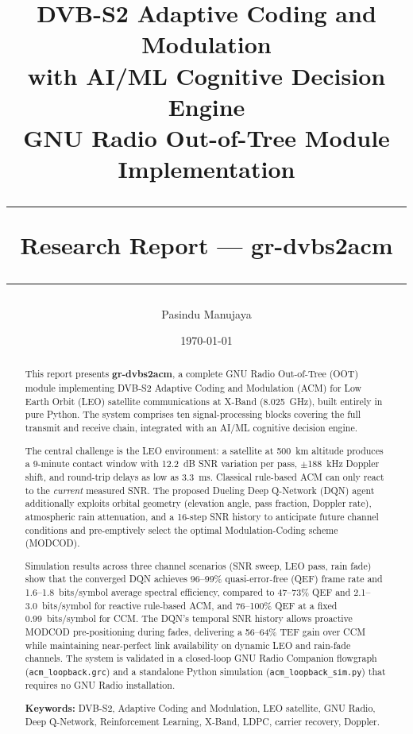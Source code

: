 \documentclass[12pt,a4paper]{report}
\title{
    \vspace{2cm}
    {\LARGE \textbf{DVB-S2 Adaptive Coding and Modulation}}\\[0.5em]
    {\large with AI/ML Cognitive Decision Engine}\\[0.5em]
    {\large GNU Radio Out-of-Tree Module Implementation}\\[2cm]
    \hrule
    \vspace{0.5em}
    {\normalsize Research Report --- gr-dvbs2acm}\\
    \vspace{0.5em}
    \hrule
}
\author{Pasindu Manujaya}
\date{\today}
\begin{document}
\maketitle
\thispagestyle{empty}

\begin{abstract}
\noindent
This report presents \textbf{gr-dvbs2acm}, a complete GNU Radio Out-of-Tree (OOT)
module implementing DVB-S2 Adaptive Coding and Modulation (ACM) for Low Earth Orbit
(LEO) satellite communications at X-Band (8.025~GHz), built entirely in pure Python.
The system comprises ten signal-processing blocks covering the full transmit and
receive chain, integrated with an AI/ML cognitive decision engine.

The central challenge is the LEO environment: a satellite at 500~km altitude produces
a 9-minute contact window with 12.2~dB SNR variation per pass, $\pm$188~kHz Doppler
shift, and round-trip delays as low as 3.3~ms.  Classical rule-based ACM can only
react to the \emph{current} measured SNR.  The proposed Dueling Deep Q-Network (DQN)
agent additionally exploits orbital geometry (elevation angle, pass fraction, Doppler
rate), atmospheric rain attenuation, and a 16-step SNR history to anticipate future
channel conditions and pre-emptively select the optimal Modulation-Coding scheme
(MODCOD).

Simulation results across three channel scenarios (SNR sweep, LEO pass, rain fade)
show that the converged DQN achieves 96--99\% quasi-error-free (QEF) frame rate
and 1.6--1.8~bits/symbol average spectral efficiency, compared to 47--73\% QEF
and 2.1--3.0~bits/symbol for reactive rule-based ACM, and 76--100\% QEF at a
fixed 0.99~bits/symbol for CCM.  The DQN's temporal SNR history allows proactive
MODCOD pre-positioning during fades, delivering a 56--64\% TEF gain over CCM
while maintaining near-perfect link availability on dynamic LEO and rain-fade channels.
The system is validated in a closed-loop GNU Radio Companion flowgraph
(\texttt{acm\_loopback.grc}) and a standalone Python simulation
(\texttt{acm\_loopback\_sim.py}) that requires no GNU Radio installation.

\textbf{Keywords:} DVB-S2, Adaptive Coding and Modulation, LEO satellite, GNU Radio,
Deep Q-Network, Reinforcement Learning, X-Band, LDPC, carrier recovery, Doppler.
\end{abstract}

\tableofcontents
\newpage
\end{document}
